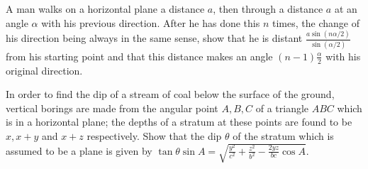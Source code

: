 \item A man walks on a horizontal plane a distance $a$, then through a distance $a$ at an angle $\alpha$ with his
  previous direction. After he has done this $n$ times, the change of his direction being always in the same sense, show
  that he is distant $\frac{a\sin(n\alpha/2)}{\sin(\alpha/2)}$ from his starting point and that this distance makes an
  angle $(n - 1)\frac{\alpha}{2}$ with his original direction.

\item In order to find the dip of a stream of coal below the surface of the ground, vertical borings are made from the angular point
  $A, B, C$ of a triangle $ABC$ which is in a horizontal plane; the depths of a stratum at these points are found to
  be $x, x + y$ and $x + z$ respectively. Show that the dip $\theta$ of the stratum which is assumed to be a
  plane is given by $\tan\theta\sin A = \sqrt{\frac{y^2}{c^2} + \frac{z^2}{b^2} - \frac{2yz}{bc}\cos A}$.
\stopitemize
